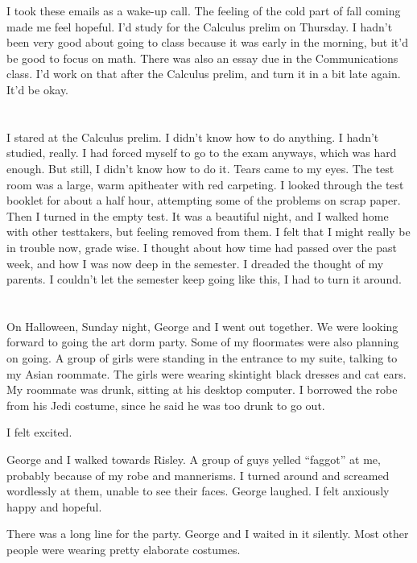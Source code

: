 I took these emails as a wake-up call.  The feeling of the cold part of fall
coming made me feel hopeful.  I'd study for the Calculus prelim on Thursday.  I
hadn't been very good about going to class because it was early in the morning,
but it'd be good to focus on math.  There was also an essay due in the
Communications class.  I'd work on that after the Calculus prelim, and turn it
in a bit late again.  It'd be okay.

\section{}

I stared at the Calculus prelim.  I didn't know how to do anything.  I hadn't
studied, really. I had forced myself to go to the exam anyways, which was hard
enough.  But still, I didn't know how to do it.  Tears came to my eyes.  The
test room was a large, warm apitheater with red carpeting. I looked through the
test booklet for about a half hour, attempting some of the problems on scrap
paper.    Then I turned in the empty test.  It was a beautiful night, and I
walked home with other testtakers, but feeling removed from them.  I felt that I
might really be in trouble now, grade wise.  I thought about how time had passed
over the past week, and how I was now deep in the semester.  I dreaded the
thought of my parents.  I couldn't let the semester keep going like this, I had
to turn it around.

\section{}

On Halloween, Sunday night, George and I went out together.  We were looking
forward to going the art dorm party.  Some of my floormates were also planning
on going.  A group of girls were standing in the entrance to my suite, talking
to my Asian roommate.  The girls were wearing skintight black dresses and cat
ears.  My roommate was drunk, sitting at his desktop computer.  I borrowed the
robe from his Jedi costume, since he said he was too drunk to go out. 

I felt excited.

George and I walked towards Risley.  A group of guys yelled ``faggot'' at me,
probably because of my robe and mannerisms.  I turned around and screamed
wordlessly at them, unable to see their faces.  George laughed.  I felt
anxiously happy and hopeful.

There was a long line for the party.  George and I waited in it silently.  Most
other people were wearing pretty elaborate costumes.

